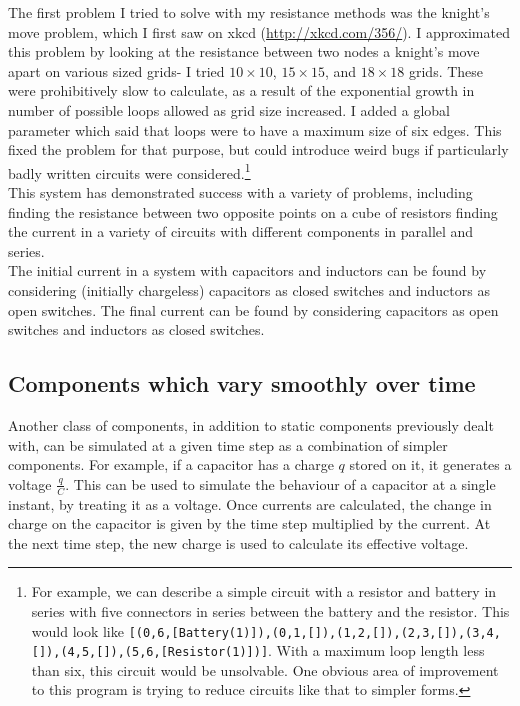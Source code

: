 \documentclass[11pt]{article}
\begin{document}
The first problem I tried to solve with my resistance methods was the knight's move problem, which I first saw on xkcd (\url{http://xkcd.com/356/}). I approximated this problem by looking at the resistance between two nodes a knight's move apart on various sized grids- I tried $10\times 10$, $15\times15$, and $18\times 18$ grids. These were prohibitively slow to calculate, as a result of the exponential growth in number of possible loops allowed as grid size increased. I added a global parameter which said that loops were to have a maximum size of six edges. This fixed the problem for that purpose, but could introduce weird bugs if particularly badly written circuits were considered.\footnote{For example, we can describe a simple circuit with a resistor and battery in series with five connectors in series between the battery and the resistor. This would look like \texttt{[(0,6,[Battery(1)]),(0,1,[]),(1,2,[]),(2,3,[]),(3,4,[]),(4,5,[]),(5,6,[Resistor(1)])]}. With a maximum loop length less than six, this circuit would be unsolvable. One obvious area of improvement to this program is trying to reduce circuits like that to simpler forms.}\\

This system has demonstrated success with a variety of problems, including finding the resistance between two opposite points on a cube of resistors finding the current in a variety of circuits with different components in parallel and series.\\

The initial current in a system with capacitors and inductors can be found by considering (initially chargeless) capacitors as closed switches and inductors as open switches. The final current can be found by considering capacitors as open switches and inductors as closed switches.\\

\subsection*{Components which vary smoothly over time}

Another class of components, in addition to static components previously dealt with, can be simulated at a given time step as a combination of simpler components. For example, if a capacitor has a charge $q$ stored on it, it generates a voltage $\frac{q}{C}$. This can be used to simulate the behaviour of a capacitor at a single instant, by treating it as a voltage. Once currents are calculated, the change in charge on the capacitor is given by the time step multiplied by the current. At the next time step, the new charge is used to calculate its effective voltage.\\
\end{document}
